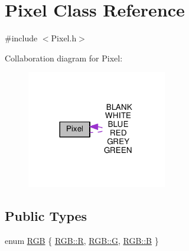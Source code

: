 \hypertarget{class_pixel}{}\section{Pixel Class Reference}
\label{class_pixel}


{\ttfamily \#include $<$Pixel.\+h$>$}



Collaboration diagram for Pixel\+:\nopagebreak
\begin{figure}[H]
\begin{center}
\leavevmode
\includegraphics[width=173pt]{class_pixel__coll__graph}
\end{center}
\end{figure}
\subsection*{Public Types}
\begin{DoxyCompactItemize}
\item 
enum \hyperlink{class_pixel_ac2ab5194684b31a50d429b26a0569ed9}{R\+GB} \{ \hyperlink{class_pixel_ac2ab5194684b31a50d429b26a0569ed9ae1e1d3d40573127e9ee0480caf1283d6}{R\+G\+B\+::R}, 
\hyperlink{class_pixel_ac2ab5194684b31a50d429b26a0569ed9adfcf28d0734569a6a693bc8194de62bf}{R\+G\+B\+::G}, 
\hyperlink{class_pixel_ac2ab5194684b31a50d429b26a0569ed9a9d5ed678fe57bcca610140957afab571}{R\+G\+B\+::B}
 \}
\end{DoxyCompactItemize}
